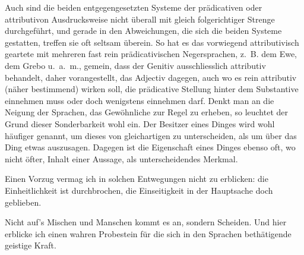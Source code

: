 Auch sind die beiden entgegengesetzten Systeme der prädicativen oder attributivon Ausdrucksweise nicht überall mit gleich folgerichtiger Strenge durchgeführt, und gerade in den Abweichungen, die sich die beiden Systeme gestatten, treffen sie oft seltsam überein. So hat es das vorwiegend attributivisch geartete   mit mehreren fast rein prädicativischen Negersprachen, z.~B. dem Ewe, dem Grebo u.~a.~m., gemein, dass der Genitiv ausschliesslich attributiv behandelt, daher vorangestellt, das Adjectiv dagegen, auch wo es rein attributiv (näher bestimmend) wirken soll, die prädicative Stellung hinter dem Substantive einnehmen muss oder doch wenigstens einnehmen darf. Denkt man an die Neigung der Sprachen, das Gewöhnliche zur Regel zu erheben, so leuchtet der Grund dieser Sonderbarkeit wohl ein. Der Besitzer eines Dinges wird wohl häufiger genannt, um dieses von  gleichartigen zu unterscheiden, als um über das Ding etwas auszusagen. Dagegen ist die Eigenschaft eines Dinges ebenso oft, wo nicht öfter, Inhalt einer Aussage, als unterscheidendes Merkmal.

\largerpage
Einen Vorzug vermag ich in solchen Entwegungen nicht zu erblicken: die Einheitlichkeit ist durchbrochen, die Einseitigkeit in der Hauptsache doch geblieben.

Nicht auf’s Mischen und Manschen kommt es an, sondern  Scheiden. Und hier erblicke ich einen wahren Probestein für die sich in den Sprachen bethätigende geistige Kraft. 


